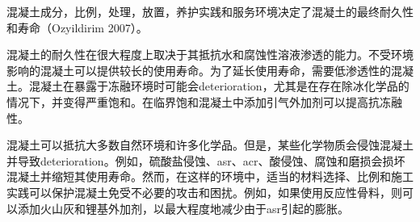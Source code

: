 混凝土成分，比例，处理，放置，养护实践和服务环境决定了混凝土的最终耐久性和寿命（Ozyildirim 2007）。


混凝土的耐久性在很大程度上取决于其抵抗水和腐蚀性溶液渗透的能力。不受环境影响的混凝土可以提供较长的使用寿命。为了延长使用寿命，需要低渗透性的混凝土。混凝土在暴露于冻融环境时可能会\gls{deterioration}，尤其是在存在除冰化学品的情况下，并变得严重饱和。在临界饱和混凝土中添加引气外加剂可以提高抗冻融性。


混凝土可以抵抗大多数自然环境和许多化学品。但是，某些化学物质会侵蚀混凝土并导致\gls*{deterioration}。例如，硫酸盐侵蚀、\acrlong*{asr}、\acrlong*{acr}、酸侵蚀、腐蚀和磨损会损坏混凝土并缩短其使用寿命。然而，在这样的环境中，适当的材料选择、比例和施工实践可以保护混凝土免受不必要的攻击和困扰。例如，如果使用反应性骨料，则可以添加火山灰和锂基外加剂，以最大程度地减少由于\acrlong*{asr}引起的膨胀。



